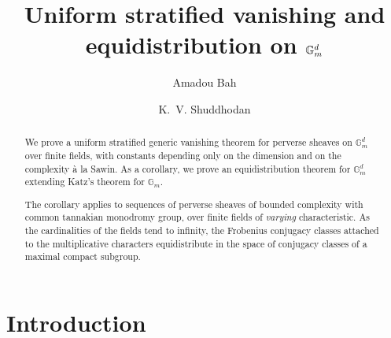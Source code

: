 \documentclass[12pt,reqno]{amsart}
\title{Uniform stratified vanishing and equidistribution on \(\Gm^d\)}
\author{Amadou Bah}
\author{K.~V. Shuddhodan}
\theoremstyle{definition}
\theoremstyle{plain}
\theoremstyle{definition}
\theoremstyle{remark}
\newcommand{\bbG}{\mathbb{G}}  \newcommand{\bbH}{\mathbb{H}}
\newcommand{\Gm}{\bbG_m}
\newif\ifasens
\begin{document}
\begin{abstract}
We prove a uniform stratified generic vanishing theorem for perverse sheaves on \(\Gm^d\) over
finite fields, with constants depending only on the dimension and on the complexity \`a la
Sawin.  As a corollary, we prove an equidistribution theorem for \(\Gm^d\)
extending Katz's theorem for \(\Gm\).

The corollary applies to sequences of perverse sheaves of
bounded complexity with common tannakian monodromy group, over finite fields of
\emph{varying} characteristic.  As the cardinalities of the fields tend to infinity, the Frobenius
conjugacy classes attached to the multiplicative characters equidistribute in the space of
conjugacy classes of a maximal compact subgroup.
\end{abstract}

\maketitle

\ifasens
\begin{center}
\begin{minipage}{0.88\textwidth}
\small
\noindent\textsc{R\'esum\'e}.  Nous d\'emontrons un th\'eor\`eme d'annulation g\'en\'erique stratifi\'ee
uniforme pour les faisceaux pervers sur \(\Gm^d\) au-dessus d'un corps fini, les constantes ne d\'ependant
que de la dimension et de la complexit\'e \`a la Sawin.  Nous en d\'eduisons un th\'eor\`eme
d'\'equir\'epartition sur \(\Gm^d\) qui \'etend le th\'eor\`eme de Katz pour \(\Gm\).

\smallskip
\noindent Ce corollaire s'applique aux suites de faisceaux pervers de complexit\'e born\'ee ayant un
m\^eme groupe de monodromie tannakien, sur des corps finis de caract\'eristique \emph{variable}.
Lorsque les cardinaux des corps tendent vers l'infini, les classes de conjugaison de Frobenius
attach\'ees aux caract\`eres multiplicatifs s'\'equir\'epartissent dans l'espace des classes de
conjugaison d'un sous-groupe compact maximal.
\end{minipage}
\end{center}
\medskip
\fi
\setcounter{tocdepth}{1}
\tableofcontents

\section{Introduction}
\label{sec:statement}
\end{document}
